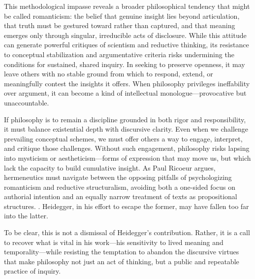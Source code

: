 \documentclass{article}
\begin{document}
This methodological impasse reveals a broader philosophical tendency that might be called romanticism: the belief that genuine insight lies beyond articulation, that truth must be gestured toward rather than captured, and that meaning emerges only through singular, irreducible acts of disclosure. While this attitude can generate powerful critiques of scientism and reductive thinking, its resistance to conceptual stabilization and argumentative criteria risks undermining the conditions for sustained, shared inquiry. In seeking to preserve openness, it may leave others with no stable ground from which to respond, extend, or meaningfully contest the insights it offers. When philosophy privileges ineffability over argument, it can become a kind of intellectual monologue—provocative but unaccountable.

If philosophy is to remain a discipline grounded in both rigor and responsibility, it must balance existential depth with discursive clarity. Even when we challenge prevailing conceptual schemes, we must offer others a way to engage, interpret, and critique those challenges. Without such engagement, philosophy risks lapsing into mysticism or aestheticism—forms of expression that may move us, but which lack the capacity to build cumulative insight. As Paul Ricoeur argues, hermeneutics must navigate between the opposing pitfalls of psychologizing romanticism and reductive structuralism, avoiding both a one-sided focus on authorial intention and an equally narrow treatment of texts as propositional structures. \parencite[pp.~22-23]{ricoeur1976}. Heidegger, in his effort to escape the former, may have fallen too far into the latter.

To be clear, this is not a dismissal of Heidegger’s contribution. Rather, it is a call to recover what is vital in his work—his sensitivity to lived meaning and temporality—while resisting the temptation to abandon the discursive virtues that make philosophy not just an act of thinking, but a public and repeatable practice of inquiry.

\newpage
\printbibliography
\end{document}
